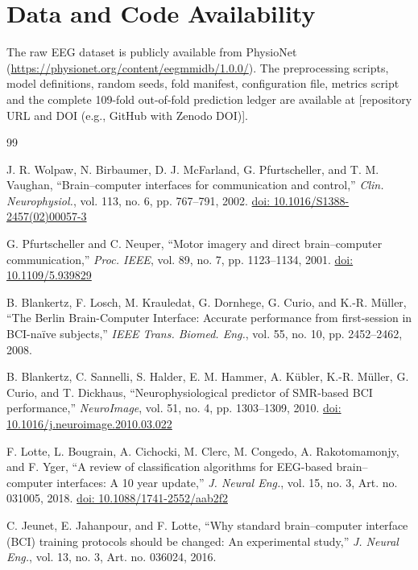 \documentclass{ieeeaccess}
\newcommand{\fillin}[1]{{\color{red}[#1]}}
\newcommand{\doiref}[1]{\href{https://doi.org/#1}{doi: #1}}
\begin{document}
\section*{Data and Code Availability}

The raw EEG dataset is publicly available from PhysioNet (\url{https://physionet.org/content/eegmmidb/1.0.0/}). The preprocessing scripts, model definitions, random seeds, fold manifest, configuration file, metrics script and the complete 109-fold out-of-fold prediction ledger are available at \fillin{repository URL and DOI (e.g., GitHub with Zenodo DOI)}.

\begin{thebibliography}{99}

 J. R. Wolpaw, N. Birbaumer, D. J. McFarland, G. Pfurtscheller, and T. M. Vaughan, ``Brain--computer interfaces for communication and control,'' \emph{Clin. Neurophysiol.}, vol. 113, no. 6, pp. 767--791, 2002. \doiref{10.1016/S1388-2457(02)00057-3}

 G. Pfurtscheller and C. Neuper, ``Motor imagery and direct brain--computer communication,'' \emph{Proc. IEEE}, vol. 89, no. 7, pp. 1123--1134, 2001. \doiref{10.1109/5.939829}

 B. Blankertz, F. Losch, M. Krauledat, G. Dornhege, G. Curio, and K.-R. M\"uller, ``The Berlin Brain-Computer Interface: Accurate performance from first-session in BCI-na\"ive subjects,'' \emph{IEEE Trans. Biomed. Eng.}, vol. 55, no. 10, pp. 2452--2462, 2008.

 B. Blankertz, C. Sannelli, S. Halder, E. M. Hammer, A. K\"ubler, K.-R. M\"uller, G. Curio, and T. Dickhaus, ``Neurophysiological predictor of SMR-based BCI performance,'' \emph{NeuroImage}, vol. 51, no. 4, pp. 1303--1309, 2010. \doiref{10.1016/j.neuroimage.2010.03.022}

 F. Lotte, L. Bougrain, A. Cichocki, M. Clerc, M. Congedo, A. Rakotomamonjy, and F. Yger, ``A review of classification algorithms for EEG-based brain--computer interfaces: A 10 year update,'' \emph{J. Neural Eng.}, vol. 15, no. 3, Art. no. 031005, 2018. \doiref{10.1088/1741-2552/aab2f2}

 C. Jeunet, E. Jahanpour, and F. Lotte, ``Why standard brain--computer interface (BCI) training protocols should be changed: An experimental study,'' \emph{J. Neural Eng.}, vol. 13, no. 3, Art. no. 036024, 2016.


\end{thebibliography}
\end{document}
